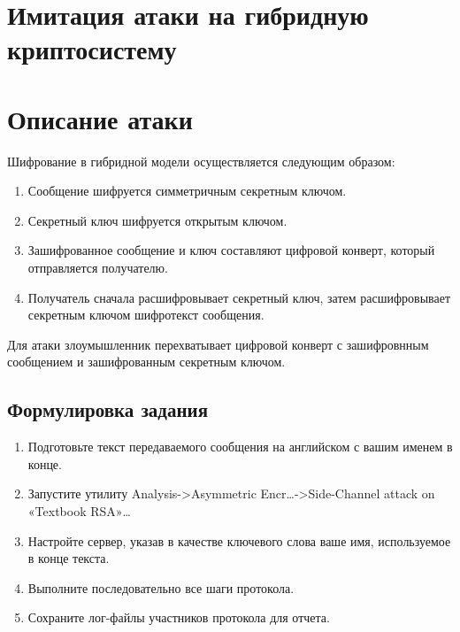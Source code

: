 \documentclass[a4paper, 14pt]{extarticle}
\begin{document}
\section{Имитация атаки на гибридную криптосистему}
\section{Описание атаки}
Шифрование в гибридной модели осуществляется следующим образом:
\begin{enumerate}
    \item  Сообщение шифруется симметричным секретным ключом.
    \item  Секретный ключ шифруется открытым ключом.
    \item  Зашифрованное сообщение и ключ составляют цифровой конверт, который отправляется получателю.
    \item  Получатель сначала расшифровывает секретный ключ, затем расшифровывает секретным ключом шифротекст сообщения.
\end{enumerate}

Для атаки злоумышленник перехватывает цифровой конверт с зашифровнным сообщением и зашифрованным секретным ключом. 

\subsection{Формулировка задания}
\begin{enumerate}
    \item Подготовьте текст передаваемого сообщения на английском с вашим именем в конце.
    \item Запустите утилиту Analysis->Asymmetric Encr…->Side-Channel attack on «Textbook RSA»…
    \item Настройте сервер, указав в качестве ключевого слова ваше имя, используемое в конце текста.
    \item Выполните последовательно все шаги протокола.
    \item Сохраните лог-файлы участников протокола для отчета.
\end{enumerate}
\end{document}
